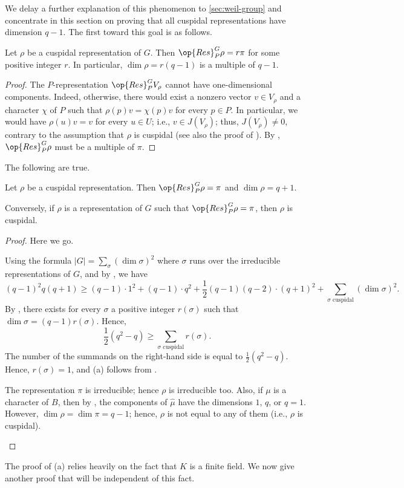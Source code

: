\documentclass[../main.tex]{subfiles}
\begin{document}
We delay a further explanation of this phenomenon to \cref{sec:weil-group} and concentrate in this section on proving that all cuspidal representations have dimension $q-1$. The first toward this goal is as follows.
\begin{lemma} \label{lem:almost-cuspidal-dim}
	Let $\rho$ be a cuspidal representation of $G$. Then $\op{Res}^G_P\rho=r\pi$ for some positive integer $r$. In particular, $\dim\rho=r(q-1)$ is a multiple of $q-1$.
\end{lemma}
\begin{proof}
	The $P$-representation $\op{Res}^G_PV_\rho$ cannot have one-dimensional components. Indeed, otherwise, there would exist a nonzero vector $v\in V_\rho$ and a character $\chi$ of $P$ such that $\rho(p)v=\chi(p)v$ for every $p\in P$. In particular, we would have $\rho(u)v=v$ for every $u\in U$; i.e., $v\in J(V_\rho)$; thus, $J(V_\rho)\ne0$, contrary to the assumption that $\rho$ is cuspidal (see also the proof of ). By , $\op{Res}^G_P\rho$ must be a multiple of $\pi$.
\end{proof}
\begin{proposition} \label{prop:cuspidal-dim}
	The following are true.
	\begin{listalph}
		\item Let $\rho$ be a cuspidal representation. Then $\op{Res}^G_P\rho=\pi$ and $\dim\rho=q+1$.
		\item Conversely, if $\rho$ is a representation of $G$ such that $\op{Res}^G_P\rho=\pi$, then $\rho$ is cuspidal.
	\end{listalph}
\end{proposition}
\begin{proof}
	Here we go.
	\begin{listalph}
		\item Using the formula $\left|G\right|=\sum_\sigma(\dim\sigma)^2$ where $\sigma$ runs over the irreducible representations of $G$, and by , we have
		\[(q-1)^2q(q+1)\ge(q-1)\cdot1^2+(q-1)\cdot q^2+\frac12(q-1)(q-2)\cdot(q+1)^2+\sum_{\sigma\text{ cuspidal}}(\dim\sigma)^2.\]
		By , there exists for every $\sigma$ a positive integer $r(\sigma)$ such that $\dim\sigma=(q-1)r(\sigma)$. Hence,
		\[\frac12\left(q^2-q\right)\ge\sum_{\sigma\text{ cuspidal}}r(\sigma).\]
		The number of the summands on the right-hand side is equal to $\frac12\left(q^2-q\right)$. Hence, $r(\sigma)=1$, and (a) follows from .
		\item The representation $\pi$ is irreducible; hence $\rho$ is irreducible too. Also, if $\mu$ is a character of $B$, then by , the components of $\widehat\mu$ have the dimensions $1$, $q$, or $q=1$. However, $\dim\rho=\dim\pi=q-1$; hence, $\rho$ is not equal to any of them (i.e., $\rho$ is cuspidal).
		\qedhere
	\end{listalph}
\end{proof}
The proof of (a) relies heavily on the fact that $K$ is a finite field. We now give another proof that will be independent of this fact.
\end{document}
